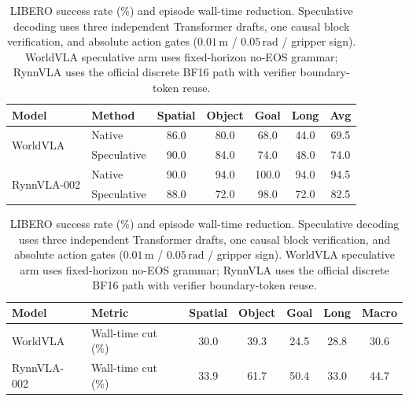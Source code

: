 \begin{table}[t]
\centering
\caption{LIBERO success rate (\%) and episode wall-time reduction. Speculative decoding uses three independent Transformer drafts, one causal block verification, and absolute action gates ($0.01\,\mathrm{m}$ / $0.05\,\mathrm{rad}$ / gripper sign). WorldVLA speculative arm uses fixed-horizon no-EOS grammar; RynnVLA uses the official discrete BF16 path with verifier boundary-token reuse.}
\label{tab:main-libero}
\setlength{\tabcolsep}{4pt}
\begin{tabular}{llccccc}
\toprule
Model & Method & Spatial & Object & Goal & Long & Avg \\
\midrule
\multirow{2}{*}{WorldVLA}
  & Native
  & 86.0 & 80.0 & 68.0 & 44.0 & 69.5 \\
  & Speculative
  & 90.0 & 84.0 & 74.0 & 48.0 & 74.0 \\
\midrule
\multirow{2}{*}{RynnVLA-002}
  & Native
  & 90.0 & 94.0 & 100.0 & 94.0 & 94.5 \\
  & Speculative
  & 88.0 & 72.0 & 98.0 & 72.0 & 82.5 \\
\bottomrule
\end{tabular}

\vspace{0.6em}
\begin{tabular}{llccccc}
\toprule
Model & Metric & Spatial & Object & Goal & Long & Macro \\
\midrule
WorldVLA
  & Wall-time cut (\%)
  & 30.0 & 39.3 & 24.5 & 28.8 & 30.6 \\
RynnVLA-002
  & Wall-time cut (\%)
  & 33.9 & 61.7 & 50.4 & 33.0 & 44.7 \\
\bottomrule
\end{tabular}
\end{table}
